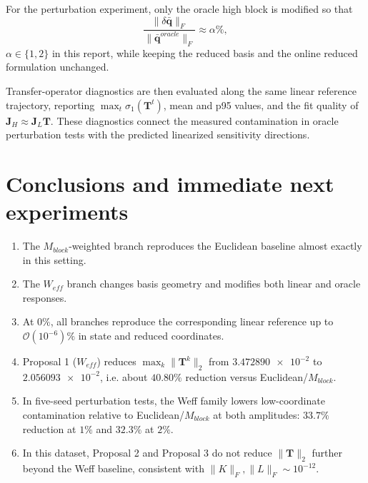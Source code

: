 \documentclass[11pt]{article}
\begin{document}
For the perturbation experiment, only the oracle high block is modified so that
\[
\frac{\|\delta\bar{\mathbf q}\|_F}{\|\bar{\mathbf q}^{oracle}\|_F}\approx \alpha\%,
\]
\(\alpha\in\{1,2\}\) in this report,
while keeping the reduced basis and the online reduced formulation unchanged.

Transfer-operator diagnostics are then evaluated along the same linear reference trajectory, reporting \(\max_t \sigma_1(\mathbf T^t)\), mean and p95 values, and the fit quality of \(\mathbf J_H\approx \mathbf J_L\mathbf T\). These diagnostics connect the measured contamination in oracle perturbation tests with the predicted linearized sensitivity directions.

\section{Conclusions and immediate next experiments}
\begin{enumerate}[leftmargin=1.5em]
\item The \(M_{block}\)-weighted branch reproduces the Euclidean baseline almost exactly in this setting.
\item The \(W_{eff}\) branch changes basis geometry and modifies both linear and oracle responses.
\item At \(0\%\), all branches reproduce the corresponding linear reference up to \(\mathcal O(10^{-6})\%\) in state and reduced coordinates.
\item Proposal 1 (\(W_{eff}\)) reduces \(\max_k\|\mathbf T^k\|_2\) from \(\num{3.472890e-2}\) to \(\num{2.056093e-2}\), i.e. about \(\num{40.80}\%\) reduction versus Euclidean/\(M_{block}\).
\item In five-seed perturbation tests, the Weff family lowers low-coordinate contamination relative to Euclidean/\(M_{block}\) at both amplitudes: \(33.7\%\) reduction at \(1\%\) and \(32.3\%\) at \(2\%\).
\item In this dataset, Proposal 2 and Proposal 3 do not reduce \(\|\mathbf T\|_2\) further beyond the Weff baseline, consistent with \(\|K\|_F,\|L\|_F\sim 10^{-12}\).
\end{enumerate}
\end{document}
